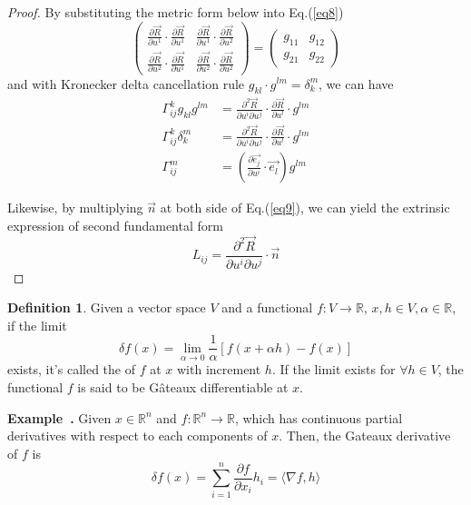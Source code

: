 \documentclass[a4paper]{article}
\theoremstyle{definition}
\newtheorem{definition}{Definition}
\theoremstyle{plain}
\newcounter{example}{Example}
\newenvironment{example}[1][]{\refstepcounter{example}\par\medskip
   \noindent \textbf{Example~\theexample. #1} \rmfamily}{\medskip}
\begin{document}
\begin{proof}
By substituting the metric form below into Eq.(\ref{eq8})
\begin{equation*}
    \begin{pmatrix}
        \frac{\partial\vec{R}}{\partial u^1}\cdot\frac{\partial\vec{R}}{\partial u^1} & \frac{\partial\vec{R}}{\partial u^1}\cdot\frac{\partial\vec{R}}{\partial u^2} \\
        \frac{\partial\vec{R}}{\partial u^2}\cdot\frac{\partial\vec{R}}{\partial u^1} & \frac{\partial\vec{R}}{\partial u^2}\cdot\frac{\partial\vec{R}}{\partial u^2}
    \end{pmatrix}
    =
    \begin{pmatrix}
        g_{11} & g_{12} \\
        g_{21} & g_{22}
    \end{pmatrix}
\end{equation*}
and with Kronecker delta cancellation rule $g_{kl}\cdot g^{lm}=\delta_k^m$, we can have
\begin{align}
    \Gamma_{ij}^kg_{kl}g^{lm}&=\frac{\partial^2\vec{R}}{\partial u^i\partial u^j}\cdot\frac{\partial\vec{R}}{\partial u^l}\cdot g^{lm}\nonumber\\
    \Gamma_{ij}^k\delta_k^m&=\frac{\partial^2\vec{R}}{\partial u^i\partial u^j}\cdot\frac{\partial\vec{R}}{\partial u^l}\cdot g^{lm}\nonumber\\
    \Gamma_{ij}^m&=\left(\frac{\partial\Vec{e_j}}{\partial u^i}\cdot\Vec{e_l}\right)g^{lm}\label{chrisex}
\end{align}

Likewise, by multiplying $\vec{n}$ at both side of Eq.(\ref{eq9}), we can yield the extrinsic expression of second fundamental form
\begin{equation*}
    L_{ij}=\frac{\partial^2\vec{R}}{\partial u^i\partial u^j}\cdot \vec{n}
\end{equation*}
\end{proof}

\begin{definition}
Given a vector space $V$ and a functional $f:V\rightarrow\mathbb{R}$, $x,h\in V, \alpha\in\mathbb{R}$, if the limit
\begin{equation*}
    \delta f(x)=\lim_{\alpha\rightarrow0}\frac{1}{\alpha}[f(x+\alpha h)-f(x)]
\end{equation*}
exists, it's called the  of $f$ at $x$ with increment $h$. If the limit exists for $\forall h\in V$, the functional $f$ is said to be G\^ateaux differentiable at $x$.
\end{definition}
\begin{example}
Given $x\in\mathbb{R}^n$ and $f:\mathbb{R}^n\rightarrow\mathbb{R}$, which has continuous partial derivatives with respect to each components of $x$. Then, the Gateaux derivative of $f$ is
\begin{equation*}
    \delta f(x)=\sum^n_{i=1}\frac{\partial f}{\partial x_i}h_i=\langle\nabla f,h\rangle
\end{equation*}
\end{example}
\end{document}
